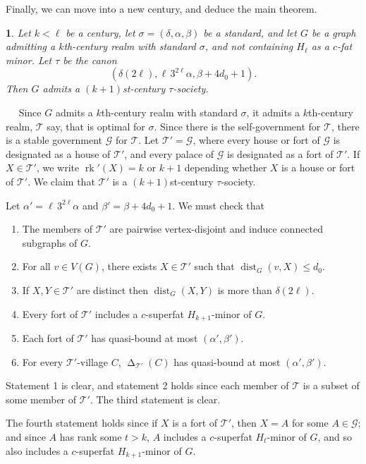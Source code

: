 \documentclass[titlepage,11pt]{article}
\newcommand{\dist}{\operatorname{dist}}
\newcommand{\voro}{\operatorname{\Delta}}
\newcommand{\rk}{\operatorname{rk}}
\newcommand{\mac}{\mathcal}
\newtheorem{thm}{}[section]
\newcommand{\Proof}{\noindent{\bf Proof.}\ \ }
\begin{document}
	Finally, we can move into a new century, and deduce the main theorem.
	\begin{thm}\label{realmtosoc}
		Let $k<\ell$ be a century, let $\sigma= (\delta, \alpha,\beta)$ be a 
		standard, and let $G$ be a graph admitting a $k$th-century realm with standard $\sigma$, and not containing $H_\ell$ as a $c$-fat minor.
		Let $\tau$ be the canon
		$$(\delta(2\ell), \ell\,3^{2\ell}\alpha, \beta+4d_0+1).$$
		Then $G$ admits a $(k+1)$st-century $\tau$-society.
	\end{thm}
	\Proof
	Since $G$ admits a $k$th-century realm with standard $\sigma$, 
	it admits a $k$th-century realm, $\mac T$ say, that is optimal for $\sigma$. Since there is the self-government for $\mac T$, there is a stable
	government $\mac G$ for $\mac T$. Let $\mac T'=\mac G$, where every house or fort of $\mac G$ is designated as a house of $\mac T'$, and every palace of $\mac G$ is designated as a fort of $\mac T'$.
	If $X\in \mac T'$, we write $\rk'(X)=k$ or $k+1$ depending whether $X$ is a house or fort of $\mac T'$.
	We claim that $\mac T'$ is a $(k+1)$st-century $\tau$-society.
	
	Let $\alpha'=\ell\,3^{2\ell}\alpha$ and $\beta'=\beta+4d_0+1$.
	We must check that
	\begin{enumerate}
		\item The members of $\mac T'$ are pairwise vertex-disjoint and induce connected subgraphs of $G$.
		\item For all $v\in V(G)$, there exists $X\in \mathcal{T}'$ such that $\dist_G(v,X)\le d_0$.
		\item If $X,Y\in \mac T'$ are distinct then $\dist_G(X,Y)$ is more than $\delta(2\ell)$.
		\item Every fort of $\mac T'$ includes a $c$-superfat $H_{k+1}$-minor of $G$.
		\item Each fort of $\mac T'$ has quasi-bound at most $(\alpha', \beta')$.
		\item For every $\mac T'$-village $C$,
		$\voro_{\mac T'}(C)$ has quasi-bound at most $(\alpha',\beta')$.
	\end{enumerate}
	Statement 1 is clear, and statement 2 holds since each member of $\mac T$ is a subset of some member of $\mac T'$.
	The third statement is clear.
	
	The fourth statement holds since if $X$ is a fort of $\mac T'$, then $X=A$ for some $A\in \mac G$; and since $A$ has
	rank some $t>k$, $A$ includes a $c$-superfat $H_t$-minor of $G$, and so also includes a $c$-superfat $H_{k+1}$-minor of $G$.
	
\end{document}
